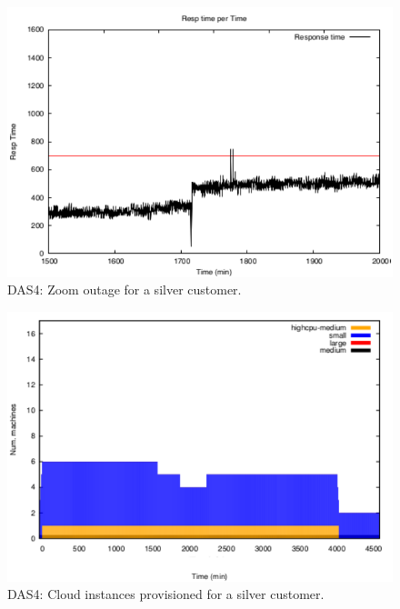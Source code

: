 \begin{figure}
  \begin{center}
    \includegraphics[width=.85\linewidth]{images/exps2011/medium/das/proxyDataPoints_output_filtered.pdf}
  \end{center}
\vspace{-5mm}
  \caption{DAS4: Zoom outage for a silver customer.}
  \label{zoomOutage}
\end{figure}

\begin{figure}
  \begin{center}
    \includegraphics[width=.85\linewidth]{images/exps2011/medium/das/inst_type_machines.pdf}
  \end{center}
\vspace{-5mm}
  \caption{DAS4: Cloud instances provisioned for a silver customer.}
  \label{mediumInstances}
\end{figure}

